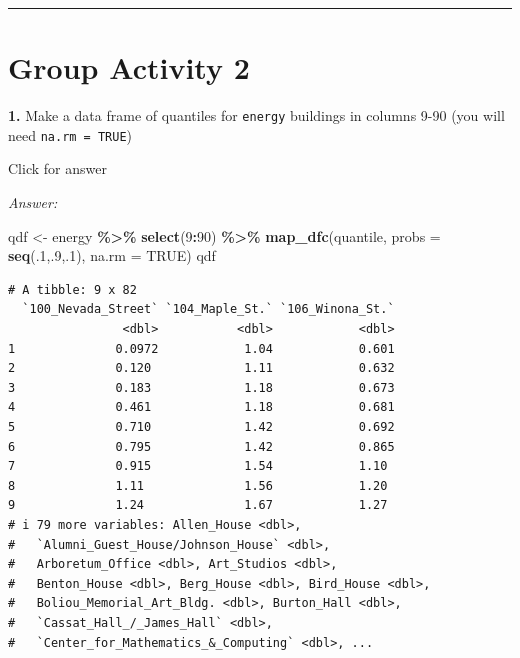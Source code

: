 \documentclass[
]{book}
\newenvironment{Shaded}{\begin{snugshade}}{\end{snugshade}}
\newcommand{\AttributeTok}[1]{\textcolor[rgb]{0.13,0.29,0.53}{#1}}
\newcommand{\ConstantTok}[1]{\textcolor[rgb]{0.56,0.35,0.01}{#1}}
\newcommand{\DecValTok}[1]{\textcolor[rgb]{0.00,0.00,0.81}{#1}}
\newcommand{\FunctionTok}[1]{\textcolor[rgb]{0.13,0.29,0.53}{\textbf{#1}}}
\newcommand{\NormalTok}[1]{#1}
\newcommand{\OtherTok}[1]{\textcolor[rgb]{0.56,0.35,0.01}{#1}}
\newcommand{\SpecialCharTok}[1]{\textcolor[rgb]{0.81,0.36,0.00}{\textbf{#1}}}
\begin{document}
\begin{center}\rule{0.5\linewidth}{0.5pt}\end{center}

\hypertarget{group-activity-2-2}{%
\section{Group Activity 2}\label{group-activity-2-2}}

\textbf{1.} Make a data frame of quantiles for \texttt{energy} buildings in columns 9-90 (you will need \texttt{na.rm\ =\ TRUE})

Click for answer

\emph{Answer:}

\begin{Shaded}
\begin{Highlighting}[]
\NormalTok{qdf }\OtherTok{\textless{}{-}}\NormalTok{ energy }\SpecialCharTok{\%\textgreater{}\%} \FunctionTok{select}\NormalTok{(}\DecValTok{9}\SpecialCharTok{:}\DecValTok{90}\NormalTok{) }\SpecialCharTok{\%\textgreater{}\%}
  \FunctionTok{map\_dfc}\NormalTok{(quantile, }\AttributeTok{probs =} \FunctionTok{seq}\NormalTok{(.}\DecValTok{1}\NormalTok{,.}\DecValTok{9}\NormalTok{,.}\DecValTok{1}\NormalTok{), }\AttributeTok{na.rm =} \ConstantTok{TRUE}\NormalTok{)}
\NormalTok{qdf}
\end{Highlighting}
\end{Shaded}

\begin{verbatim}
# A tibble: 9 x 82
  `100_Nevada_Street` `104_Maple_St.` `106_Winona_St.`
                <dbl>           <dbl>            <dbl>
1              0.0972            1.04            0.601
2              0.120             1.11            0.632
3              0.183             1.18            0.673
4              0.461             1.18            0.681
5              0.710             1.42            0.692
6              0.795             1.42            0.865
7              0.915             1.54            1.10 
8              1.11              1.56            1.20 
9              1.24              1.67            1.27 
# i 79 more variables: Allen_House <dbl>,
#   `Alumni_Guest_House/Johnson_House` <dbl>,
#   Arboretum_Office <dbl>, Art_Studios <dbl>,
#   Benton_House <dbl>, Berg_House <dbl>, Bird_House <dbl>,
#   Boliou_Memorial_Art_Bldg. <dbl>, Burton_Hall <dbl>,
#   `Cassat_Hall_/_James_Hall` <dbl>,
#   `Center_for_Mathematics_&_Computing` <dbl>, ...
\end{verbatim}
\end{document}
